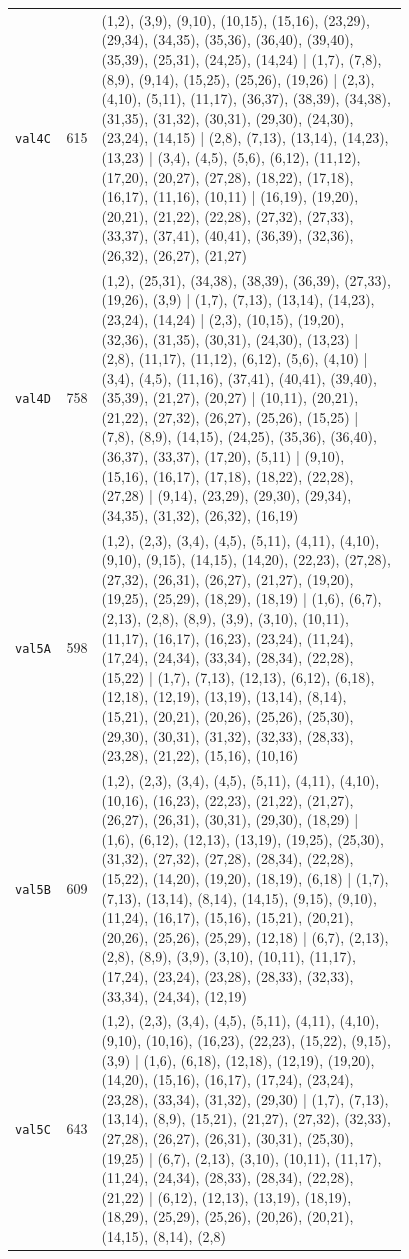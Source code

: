 \begin{landscape}
\begin{longtable}{lr>{\tiny\raggedright\arraybackslash}p{0.78\linewidth}}
\texttt{val4C} & 615 & (1,2), (3,9), (9,10), (10,15), (15,16), (23,29), (29,34), (34,35), (35,36), (36,40), (39,40), (35,39), (25,31), (24,25), (14,24) | (1,7), (7,8), (8,9), (9,14), (15,25), (25,26), (19,26) | (2,3), (4,10), (5,11), (11,17), (36,37), (38,39), (34,38), (31,35), (31,32), (30,31), (29,30), (24,30), (23,24), (14,15) | (2,8), (7,13), (13,14), (14,23), (13,23) | (3,4), (4,5), (5,6), (6,12), (11,12), (17,20), (20,27), (27,28), (18,22), (17,18), (16,17), (11,16), (10,11) | (16,19), (19,20), (20,21), (21,22), (22,28), (27,32), (27,33), (33,37), (37,41), (40,41), (36,39), (32,36), (26,32), (26,27), (21,27) \\[2pt]
\texttt{val4D} & 758 & (1,2), (25,31), (34,38), (38,39), (36,39), (27,33), (19,26), (3,9) | (1,7), (7,13), (13,14), (14,23), (23,24), (14,24) | (2,3), (10,15), (19,20), (32,36), (31,35), (30,31), (24,30), (13,23) | (2,8), (11,17), (11,12), (6,12), (5,6), (4,10) | (3,4), (4,5), (11,16), (37,41), (40,41), (39,40), (35,39), (21,27), (20,27) | (10,11), (20,21), (21,22), (27,32), (26,27), (25,26), (15,25) | (7,8), (8,9), (14,15), (24,25), (35,36), (36,40), (36,37), (33,37), (17,20), (5,11) | (9,10), (15,16), (16,17), (17,18), (18,22), (22,28), (27,28) | (9,14), (23,29), (29,30), (29,34), (34,35), (31,32), (26,32), (16,19) \\[2pt]
\texttt{val5A} & 598 & (1,2), (2,3), (3,4), (4,5), (5,11), (4,11), (4,10), (9,10), (9,15), (14,15), (14,20), (22,23), (27,28), (27,32), (26,31), (26,27), (21,27), (19,20), (19,25), (25,29), (18,29), (18,19) | (1,6), (6,7), (2,13), (2,8), (8,9), (3,9), (3,10), (10,11), (11,17), (16,17), (16,23), (23,24), (11,24), (17,24), (24,34), (33,34), (28,34), (22,28), (15,22) | (1,7), (7,13), (12,13), (6,12), (6,18), (12,18), (12,19), (13,19), (13,14), (8,14), (15,21), (20,21), (20,26), (25,26), (25,30), (29,30), (30,31), (31,32), (32,33), (28,33), (23,28), (21,22), (15,16), (10,16) \\[2pt]
\texttt{val5B} & 609 & (1,2), (2,3), (3,4), (4,5), (5,11), (4,11), (4,10), (10,16), (16,23), (22,23), (21,22), (21,27), (26,27), (26,31), (30,31), (29,30), (18,29) | (1,6), (6,12), (12,13), (13,19), (19,25), (25,30), (31,32), (27,32), (27,28), (28,34), (22,28), (15,22), (14,20), (19,20), (18,19), (6,18) | (1,7), (7,13), (13,14), (8,14), (14,15), (9,15), (9,10), (11,24), (16,17), (15,16), (15,21), (20,21), (20,26), (25,26), (25,29), (12,18) | (6,7), (2,13), (2,8), (8,9), (3,9), (3,10), (10,11), (11,17), (17,24), (23,24), (23,28), (28,33), (32,33), (33,34), (24,34), (12,19) \\[2pt]
\texttt{val5C} & 643 & (1,2), (2,3), (3,4), (4,5), (5,11), (4,11), (4,10), (9,10), (10,16), (16,23), (22,23), (15,22), (9,15), (3,9) | (1,6), (6,18), (12,18), (12,19), (19,20), (14,20), (15,16), (16,17), (17,24), (23,24), (23,28), (33,34), (31,32), (29,30) | (1,7), (7,13), (13,14), (8,9), (15,21), (21,27), (27,32), (32,33), (27,28), (26,27), (26,31), (30,31), (25,30), (19,25) | (6,7), (2,13), (3,10), (10,11), (11,17), (11,24), (24,34), (28,33), (28,34), (22,28), (21,22) | (6,12), (12,13), (13,19), (18,19), (18,29), (25,29), (25,26), (20,26), (20,21), (14,15), (8,14), (2,8) \\[2pt]

\end{longtable}
\end{landscape}

